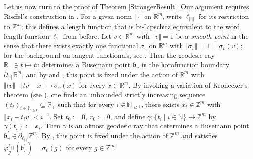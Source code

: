 \documentclass[a4paper,11pt,reqno]{amsart}
\numberwithin{equation}{section}
\numberwithin{equation}{section}
\theoremstyle{definition}
\theoremstyle{remark}
\theoremstyle{remark}
\begin{document}
Let us now turn to the proof of Theorem \ref{StrongerResult}. Our
argument requires Rieffel's construction in \cite[Section 7]{Rieffel02}.
For a given norm $\left\Vert \cdot\right\Vert $ on $\mathbb{R}^{m}$,
write $\ell_{\Vert\cdot\Vert}$ for its restriction to $\mathbb{Z}^{m}$;
this defines a length function that is bi-Lipschitz equivalent to
the word length function $\ell_1$ from before. Let $v\in\mathbb{R}^{m}$ with $\left\Vert v\right\Vert =1$
be a \emph{smooth point} in the sense that there exists exactly one
functional $\sigma_{v}$ on $\mathbb{R}^{m}$ with $ \Vert \sigma_{v} \Vert =1=\sigma_{v}(v)$;
for the background on tangent functionals, see \cite[Section V.9]{DunfordSchwartz}.
Then the geodesic ray $\mathbb{R}_{+}\ni t\mapsto tv$ determines
a Busemann point $\mathfrak{b}_{v}$ in the horofunction boundary
$\partial_{\Vert\cdot\Vert}\mathbb{R}^{m}$, and by \cite[Proposition 6.2]{Rieffel02}
and \cite[Proposition 6.3]{Rieffel02}, this point is fixed under the
action of $\mathbb{R}^{m}$ with $\Vert tv \Vert - \Vert tv-x \Vert \rightarrow \sigma_v(x)$
for every $x\in\mathbb{R}^{m}$. By invoking a variation of Kronecker's
theorem (see \cite[Lemma 7.2]{Rieffel02}), one finds an unbounded
strictly increasing sequence $(t_{i})_{i\in\mathbb{N}_{\geq1}}\subseteq\mathbb{R}_{+}$
such that for every $i\in\mathbb{N}_{\geq1}$, there exists $x_{i}\in\mathbb{Z}^{m}$
with $\left\Vert x_{i}-t_{i}v\right\Vert <i^{-1}$. Set $t_{0}:=0$,
$x_{0}:=0$, and define $\gamma:\{t_{i}\mid i\in\mathbb{N}\}\rightarrow\mathbb{Z}^{m}$
by $\gamma(t_{i}):=x_{i}$. Then $\gamma$ is an almost geodesic ray
that determines a Busemann point $\mathfrak{b}_{v}^{\prime}\in\partial_{\ell_{\Vert\cdot\Vert}}\mathbb{Z}^{m}$.
By \cite[Proposition 7.4]{Rieffel02}, this point is fixed under the
action of $\mathbb{Z}^{m}$ and satisfies $\varphi_{g}^{\ell_{\Vert\cdot\Vert}}(\mathfrak{b}_{v}^{\prime})=\sigma_{v}(g)$
for every $g\in\mathbb{Z}^{m}$.
\end{document}
